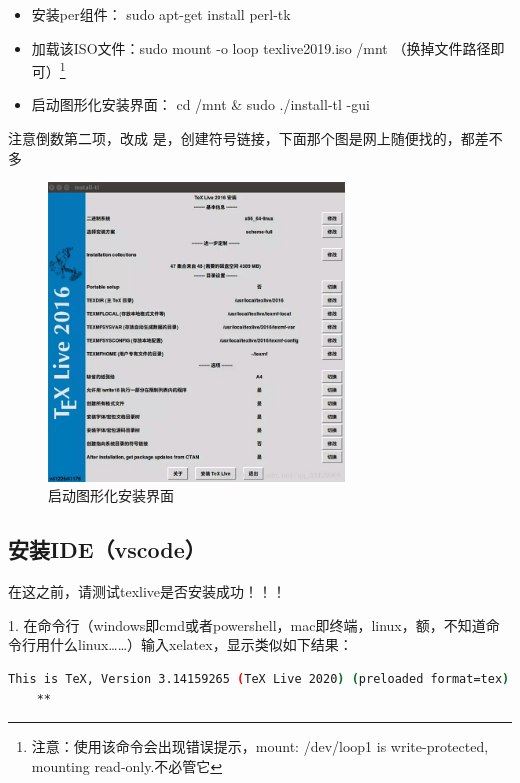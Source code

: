 \documentclass[AutoFakeBold]{template/LZUThesis2021_master}
\begin{document}
\begin{itemize}
	\item[1. ] 安装per组件： sudo apt-get install perl-tk
	\item[2. ] 加载该ISO文件：sudo mount -o loop texlive2019.iso /mnt （换掉文件路径即可）\footnote{注意：使用该命令会出现错误提示，mount: /dev/loop1 is write-protected, mounting read-only.不必管它}
	\item[3. ]启动图形化安装界面： cd /mnt \& sudo ./install-tl -gui
\end{itemize}

注意倒数第二项，改成 是，创建符号链接，下面那个图是网上随便找的，都差不多

\begin{figure}[H]
    \centering
    \includegraphics[width=0.7\textwidth]{figures/install_texlive.png}
    \caption{启动图形化安装界面}
    \label{fig_install_texlive}
\end{figure}





\subsection{安装IDE（vscode）} %
\label{sub:安装ide}

在这之前，请测试texlive是否安装成功！！！

1. 在命令行（windows即cmd或者powershell，mac即终端，linux，额，不知道命令行用什么linux……）输入xelatex，显示类似如下结果：

\begin{lstlisting}[language=bash]
    This is TeX, Version 3.14159265 (TeX Live 2020) (preloaded format=tex)
    **
\end{lstlisting}
\end{document}
